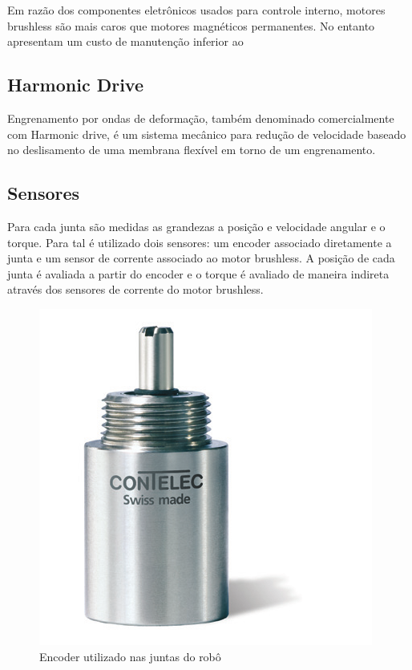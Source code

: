 Em razão dos componentes eletrônicos usados para controle interno, motores brushless são mais caros que motores magnéticos permanentes. No entanto apresentam um custo de manutenção inferior ao


\subsection{Harmonic Drive}

Engrenamento por ondas de deformação, também denominado comercialmente com Harmonic drive, é um sistema mecânico para redução de velocidade baseado no deslisamento de uma membrana flexível em torno de um engrenamento.




\subsection{Sensores}

Para cada junta são medidas as grandezas a posição e velocidade angular e o torque. Para tal é utilizado dois sensores: um encoder associado diretamente a junta e um sensor de corrente associado ao motor brushless. A posição de cada junta é avaliada a partir do encoder e o torque é avaliado de maneira indireta através dos sensores de corrente do motor brushless.

\begin{figure}[H]
    \centering
    \includegraphics[width = 0.4\linewidth]{figs/vertX-encoder.png}
        \caption{Encoder utilizado nas juntas do robô}
    \label{fig:maxon-flat-servo}
\end{figure}

